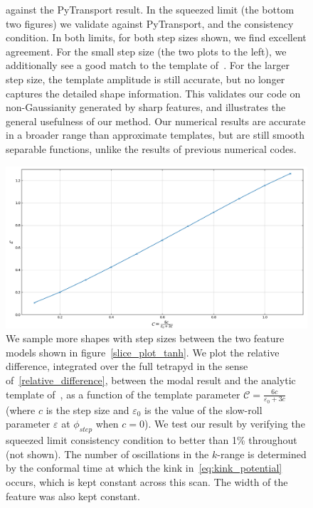\begin{figure}
{	against the PyTransport result. In the squeezed limit (the bottom two figures)
	we validate against PyTransport, and the consistency condition.
	In both limits, for both step sizes shown, we find excellent agreement.
	For the small step size (the two plots to the left), we additionally
	see a good match to the template of~\cite{adshead}. For the larger step size,
	the template amplitude is still accurate,
    but no longer captures the detailed shape information.
    This validates our code on non-Gaussianity generated by sharp
    features, and illustrates the general usefulness of our method.
	Our numerical results are accurate in a broader range than
	approximate templates, but are still smooth separable functions,
	unlike the results of previous numerical codes.
}\label{fig:tanh_sqz}
\end{figure}
\begin{figure}[!pth]
\centering
\includegraphics[width=.75\columnwidth]{plots/tanh_scan_C_cropped.png}
\caption{
    We sample more shapes with step sizes between the two
    feature models shown in figure~\ref{slice_plot_tanh}.
    We plot the relative difference,
    integrated over the full tetrapyd
    in the sense of~\eqref{relative_difference},
    between the modal result and the analytic template of~\cite{adshead},
    as a function of the template parameter $\mathcal{C}=\frac{6c}{\varepsilon_0+3c}$
    (where $c$ is the step size and $\varepsilon_0$ is the value of the slow-roll parameter
    $\varepsilon$ at $\phi_{step}$ when $c=0$). We test our result by verifying
    the squeezed limit consistency
    condition to better than 1\% throughout (not shown). The number of oscillations in the
    $k$-range is determined by the conformal time at which the kink in~\eqref{eq:kink_potential}
    occurs, which is kept constant across this scan. The width of the feature was also kept constant.
}\label{fig:tanh_scan}
\end{figure}

